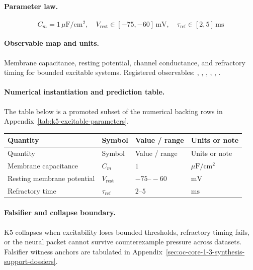 \paragraph{Parameter law.}
\[
C_m = 1\,\mu\mathrm{F/cm^2},\quad V_{\mathrm{rest}} \in [-75,-60]\,\mathrm{mV},\quad \tau_{\mathrm{ref}} \in [2,5]\,\mathrm{ms}
\]

\paragraph{Observable map and units.}
Membrane capacitance, resting potential, channel conductance, and refractory timing for bounded excitable systems.
Registered observables: , \allowbreak {}, \allowbreak {}, \allowbreak {}, \allowbreak {}, \allowbreak {}.

\paragraph{Numerical instantiation and prediction table.}
The table below is a promoted subset of the numerical backing rows in Appendix~\ref{tab:k5-excitable-parameters}.
\begin{longtable}{@{}L{0.27\textwidth}L{0.15\textwidth}L{0.24\textwidth}L{0.16\textwidth}@{}}
\toprule
Quantity & Symbol & Value / range & Units or note \\
\midrule
\endfirsthead
\toprule
Quantity & Symbol & Value / range & Units or note \\
\midrule
\endhead
Membrane capacitance & $\scriptstyle C_m$ & $1$ & $\mu\mathrm{F/cm^2}$ \\
Resting membrane potential & $\scriptstyle V_{\mathrm{rest}}$ & $-75\text{--}-60$ & $\mathrm{mV}$ \\
Refractory time & $\scriptstyle \tau_{\mathrm{ref}}$ & $2\text{--}5$ & $\mathrm{ms}$ \\
\bottomrule
\end{longtable}

\paragraph{Falsifier and collapse boundary.}
K5 collapses when excitability loses bounded thresholds, refractory timing fails, or the neural packet cannot survive counterexample pressure across datasets.
Falsifier witness anchors are tabulated in Appendix~\ref{sec:oc-core-1-3-synthesis-support-dossiers}.

